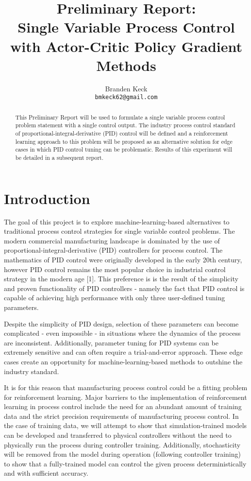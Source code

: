 \documentclass{article}
\title{Preliminary Report: \\
Single Variable Process Control with Actor-Critic Policy Gradient Methods}
\author{
  Branden Keck\\
  \texttt{bmkeck62@gmail.com} \\
}
\date{}
\begin{document}
\maketitle

\begin{abstract}
This Preliminary Report will be used to formulate a single variable process control problem statement with a single control output.  The industry process control standard of proportional-integral-derivative (PID) control will be defined and a reinforcement learning approach to this problem will be proposed as an alternative solution for edge cases in which PID control tuning can be problematic.  Results of this experiment will be detailed in a subsequent report.
\end{abstract}

\section{Introduction}
The goal of this project is to explore machine-learning-based alternatives to traditional process control strategies for single variable control problems.  The modern commercial manufacturing landscape is dominated by the use of proportional-integral-derivative (PID) controllers for process control.  The mathematics of PID control were originally developed in the early 20th century, however PID control remains the most popular choice in industrial control strategy in the modern age [1].  This preference is is the result of the simplicity and proven functionality of PID controllers - namely the fact that PID control is capable of achieving high performance with only three user-defined tuning parameters.

Despite the simplicity of PID design, selection of these parameters can become complicated - even impossible - in situations where the dynamics of the process are inconsistent.  Additionally, parameter tuning for PID systems can be extremely sensitive and can often require a trial-and-error approach.  These edge cases create an opportunity for machine-learning-based methods to outshine the industry standard.

It is for this reason that manufacturing process control could be a fitting problem for reinforcement learning.  Major barriers to the implementation of reinforcement learning in process control include the need for an abundant amount of training data and the strict precision requirements of manufacturing process control.  In the case of training data, we will attempt to show that simulation-trained models can be developed and transferred to physical controllers without the need to physically run the process during controller training.  Additionally, stochasticity will be removed from the model during operation (following controller training) to show that a fully-trained model can control the given process deterministically and with sufficient accuracy.
\end{document}
